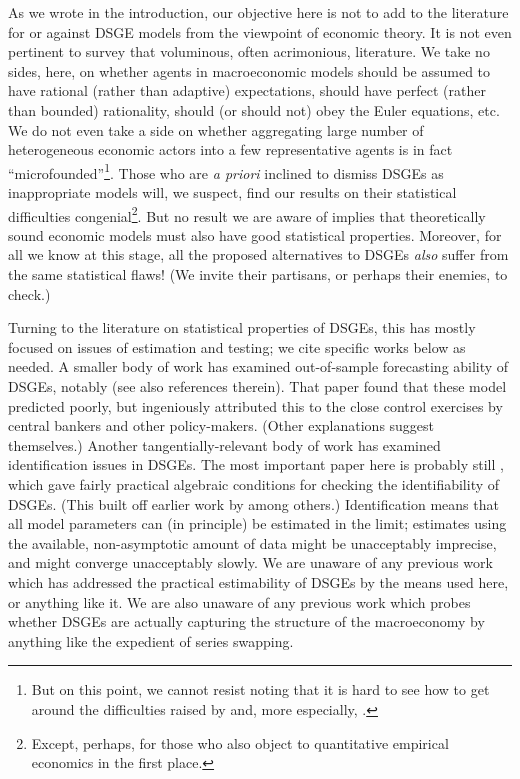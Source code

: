 \documentclass[11pt]{article}
\begin{document}
As we wrote in the introduction, our objective here is not to add to the
literature for or against DSGE models from the viewpoint of economic
theory. It is not even pertinent to survey that voluminous, often
acrimonious, literature. We take no sides, here, on whether agents in
macroeconomic models should be assumed to have rational (rather than
adaptive) expectations, should have perfect (rather than bounded)
rationality, should (or should not) obey the Euler equations, etc. We do
not even take a side on whether aggregating large number of
heterogeneous economic actors into a few representative agents is in
fact ``microfounded''\footnote{But on this point, we cannot resist
  noting that it is hard to see how to get around the difficulties
  raised by \citet{Kirman-contra-representative-agent} and, more
  especially,
  \citet{Jackson-Yariv-non-existence-of-representative-agents}.}. Those
who are \emph{a priori} inclined to dismiss DSGEs as inappropriate
models will, we suspect, find our results on their statistical
difficulties congenial\footnote{Except, perhaps, for those who also
  object to quantitative empirical economics in the first place.}. But
no result we are aware of implies that theoretically sound economic
models must also have good statistical properties. Moreover, for all we
know at this stage, all the proposed alternatives to DSGEs \emph{also}
suffer from the same statistical flaws! (We invite their partisans, or
perhaps their enemies, to check.)

Turning to the literature on statistical properties of DSGEs, this has
mostly focused on issues of estimation and testing; we cite specific
works below as needed. A smaller body of work has examined out-of-sample
forecasting ability of DSGEs, notably \citet{Edge-Gurkaynak-on-dsges}
(see also references therein). That paper found that these model
predicted poorly, but ingeniously attributed this to the close control
exercises by central bankers and other policy-makers. (Other
explanations suggest themselves.) Another tangentially-relevant body of
work has examined identification issues in DSGEs. The most important
paper here is probably still
\citet{Komunjer-Ng-identification-of-DSGEs}, which gave fairly practical
algebraic conditions for checking the identifiability of DSGEs. (This
built off earlier work by \citealt{Iskrev2009} among others.)
Identification means that all model parameters can (in principle) be
estimated in the limit; estimates using the available, non-asymptotic
amount of data might be unacceptably imprecise, and might converge
unacceptably slowly. We are unaware of any previous work which has
addressed the practical estimability of DSGEs by the means used here, or
anything like it. We are also unaware of any previous work which probes
whether DSGEs are actually capturing the structure of the macroeconomy
by anything like the expedient of series swapping.
\end{document}
